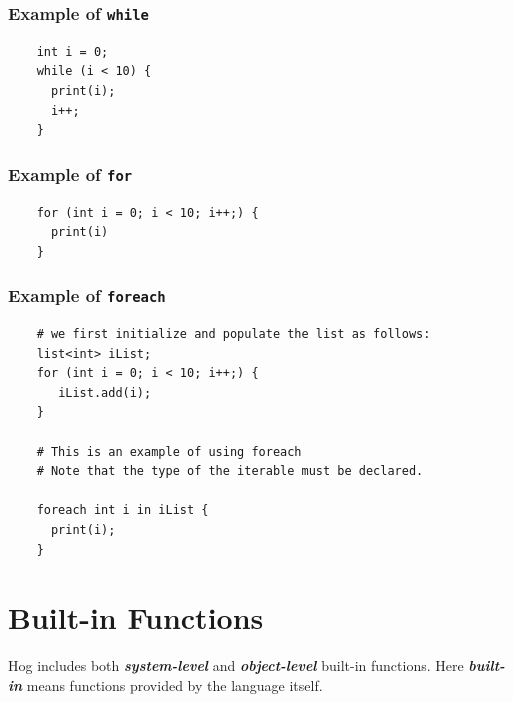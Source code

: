 \documentclass{book}
\begin{document}
\subsubsection{Example of \tt while \rm} %
\label{ssub:example_1}

\begin{verbatim}
    int i = 0;
    while (i < 10) {
      print(i);
      i++;
    }

\end{verbatim}


\subsubsection{Example of \tt for \rm} %
\label{ssub:example_2}

\begin{verbatim}
    for (int i = 0; i < 10; i++;) {
      print(i)
    }
\end{verbatim}


\subsubsection{Example of \tt foreach \rm} %
\label{ssub:example_3}

\begin{verbatim}
    # we first initialize and populate the list as follows: 
    list<int> iList;
    for (int i = 0; i < 10; i++;) {
       iList.add(i);
    }

    # This is an example of using foreach
    # Note that the type of the iterable must be declared.    

    foreach int i in iList {
      print(i);
    }
\end{verbatim}




\section{Built-in Functions} %
\label{sec:built_in_functions}

Hog includes both \emph{\textbf{system-level}} and \emph{\textbf{object-level}}
built-in functions. Here \emph{\textbf{built-in}} means functions provided by the
language itself.
\end{document}
